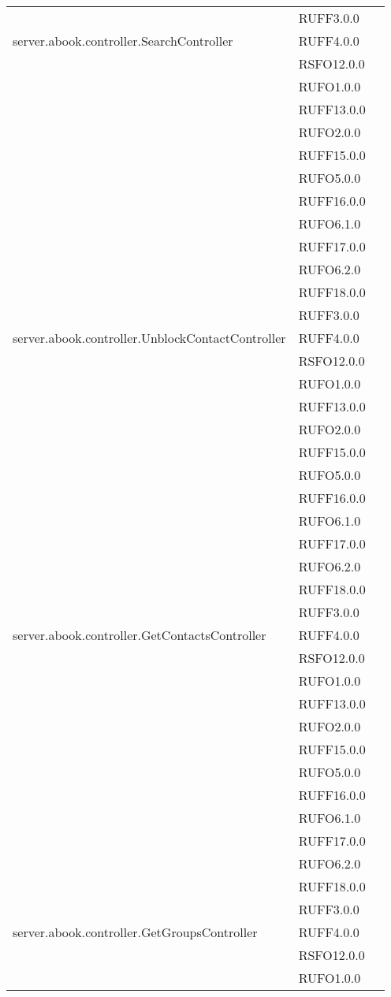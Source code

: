 \begin{center}
\begin{longtable}{lp{}l}
 & RUFF3.0.0 \\
server.abook.controller.SearchController & RUFF4.0.0 \\
 & RSFO12.0.0 \\
 & RUFO1.0.0 \\
 & RUFF13.0.0 \\
 & RUFO2.0.0 \\
 & RUFF15.0.0 \\
 & RUFO5.0.0 \\
 & RUFF16.0.0 \\
 & RUFO6.1.0 \\
 & RUFF17.0.0 \\
 & RUFO6.2.0 \\
 & RUFF18.0.0 \\
 & RUFF3.0.0 \\
server.abook.controller.UnblockContactController & RUFF4.0.0 \\
 & RSFO12.0.0 \\
 & RUFO1.0.0 \\
 & RUFF13.0.0 \\
 & RUFO2.0.0 \\
 & RUFF15.0.0 \\
 & RUFO5.0.0 \\
 & RUFF16.0.0 \\
 & RUFO6.1.0 \\
 & RUFF17.0.0 \\
 & RUFO6.2.0 \\
 & RUFF18.0.0 \\
 & RUFF3.0.0 \\
server.abook.controller.GetContactsController & RUFF4.0.0 \\
 & RSFO12.0.0 \\
 & RUFO1.0.0 \\
 & RUFF13.0.0 \\
 & RUFO2.0.0 \\
 & RUFF15.0.0 \\
 & RUFO5.0.0 \\
 & RUFF16.0.0 \\
 & RUFO6.1.0 \\
 & RUFF17.0.0 \\
 & RUFO6.2.0 \\
 & RUFF18.0.0 \\
 & RUFF3.0.0 \\
server.abook.controller.GetGroupsController & RUFF4.0.0 \\
 & RSFO12.0.0 \\
 & RUFO1.0.0 \\

\end{longtable}
\end{center}
